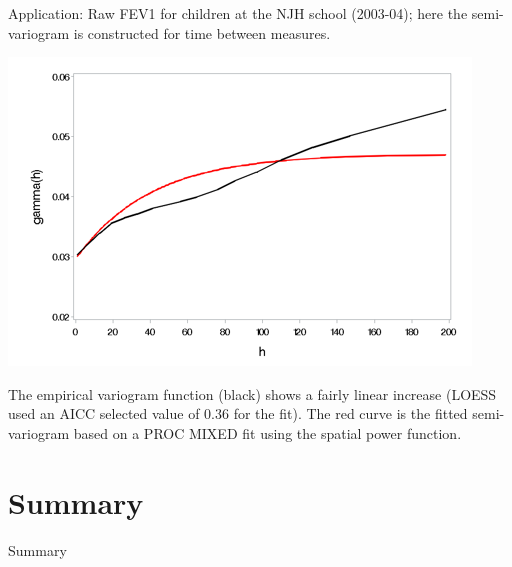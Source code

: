 \documentclass[
  9pt,
  ignorenonframetext,
]{beamer}
\begin{document}
\begin{frame}{Application:}
\protect\hypertarget{application-1}{}
Raw FEV1 for children at the NJH school (2003-04); here the
semi-variogram is constructed for time between measures.

\begin{center}\includegraphics[width=0.7\linewidth]{figs_L22/f10} \end{center}

The empirical variogram function (black) shows a fairly linear increase
(LOESS used an AICC selected value of 0.36 for the fit). The red curve
is the fitted semi-variogram based on a PROC MIXED fit using the spatial
power function.
\end{frame}

\hypertarget{summary}{%
\section{Summary}\label{summary}}

\begin{frame}{Summary}
\protect\hypertarget{summary-1}{}
\end{frame}
\end{document}
